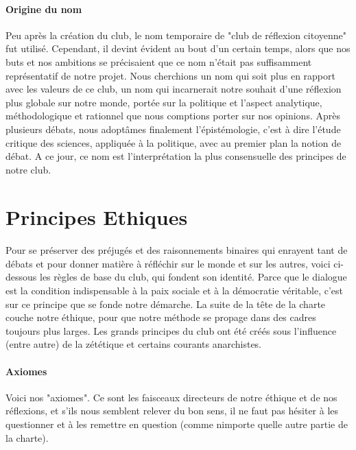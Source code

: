 \documentclass[a4paper,12pt]{article}
\begin{document}
\paragraph{Origine du nom}
Peu après la création du club, le nom temporaire de "club de réflexion citoyenne" fut utilisé. Cependant, il devint évident au bout d'un certain temps, alors que nos buts et nos ambitions se précisaient que ce nom n'était pas suffisamment représentatif de notre projet. Nous cherchions un nom qui soit plus en rapport avec les valeurs de ce club, un nom qui incarnerait notre souhait d'une réflexion plus globale sur notre monde, portée sur la politique et l'aspect analytique, méthodologique et rationnel que nous comptions porter sur nos opinions. Après plusieurs débats, nous adoptâmes finalement l'épistémologie, c'est à dire l'étude critique des sciences, appliquée à la politique, avec au premier plan la notion de débat. A ce jour, ce nom est l'interprétation la plus consensuelle des principes de notre club.
  
\section{Principes Ethiques}
\paragraph{} 
Pour se préserver des préjugés et des raisonnements binaires qui enrayent tant de débats et pour donner matière à réfléchir sur le monde et sur les autres, voici ci-dessous les règles de base du club, qui fondent son identité. Parce que le dialogue est la condition indispensable à la paix sociale et à la démocratie véritable, c'est sur ce principe que se fonde notre démarche. La suite de la tête de la charte couche notre éthique, pour que notre méthode se propage dans des cadres toujours plus larges. Les grands principes du club ont été créés sous l'influence (entre autre) de la zététique et certains courants anarchistes.

\paragraph{Axiomes}
Voici nos "axiomes". Ce sont les faisceaux directeurs de notre éthique et de nos réflexions, et s'ils nous semblent relever du bon sens, il ne faut pas hésiter à les questionner et à les remettre en question (comme nimporte quelle autre partie de la charte). 
\end{document}
